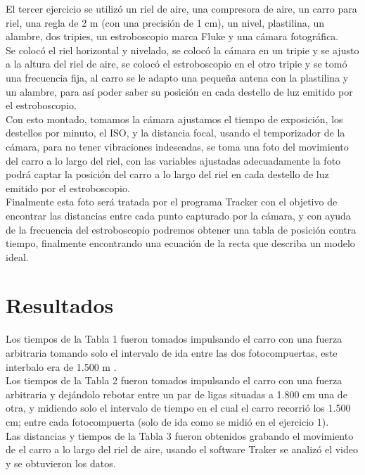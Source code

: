 \documentclass[12pt,a4paper]{article}
\begin{document}
El tercer ejercicio se utilizó un riel de aire, una compresora de aire, un carro para riel, una regla de 2 m (con una precisión de 1 cm), un nivel, plastilina, un alambre, dos tripies, un estroboscopio marca Fluke y una cámara fotográfica.\\
Se colocó el riel horizontal y nivelado, se colocó la cámara en un tripie y se ajusto a la altura del riel de aire, se colocó el estroboscopio en el otro tripie y se tomó una frecuencia fija, al carro se le adapto una pequeña antena con la plastilina y un alambre, para así poder saber su posición en cada destello de luz emitido por el estroboscopio.\\

Con esto montado, tomamos la cámara ajustamos el tiempo de exposición, los destellos por minuto, el ISO, y la distancia focal, usando el temporizador de la cámara, para no tener vibraciones indeseadas, se toma una foto del movimiento del carro a lo largo del riel, con las variables ajustadas adecuadamente la foto podrá captar la posición del carro a lo largo del riel en cada destello de luz emitido por el estroboscopio.\\

Finalmente esta foto será tratada por el programa Tracker con el objetivo de encontrar las distancias entre cada punto capturado por la cámara, y con ayuda de la frecuencia del estroboscopio podremos obtener una tabla de posición contra tiempo, finalmente encontrando una ecuación de la recta que describa un modelo ideal.

\section{Resultados}

Los tiempos de la Tabla 1 fueron tomados impulsando el carro con una fuerza arbitraria tomando solo el intervalo de ida entre las dos fotocompuertas, este interbalo era de 1.500 m .\\

Los tiempos de la Tabla 2 fueron tomados impulsando el carro con una fuerza arbitraria y dejándolo rebotar entre un par de ligas situadas a 1.800 cm una de otra, y midiendo solo el intervalo de tiempo en el cual el carro recorrió los 1.500 cm; entre cada fotocompuerta (solo de ida como se midió en el ejercicio 1).\\

Las distancias y tiempos de la Tabla 3 fueron obtenidos grabando el movimiento de el carro a lo largo del riel de aire, usando el software Traker se analizó el video y se obtuvieron los datos.\\
\end{document}
